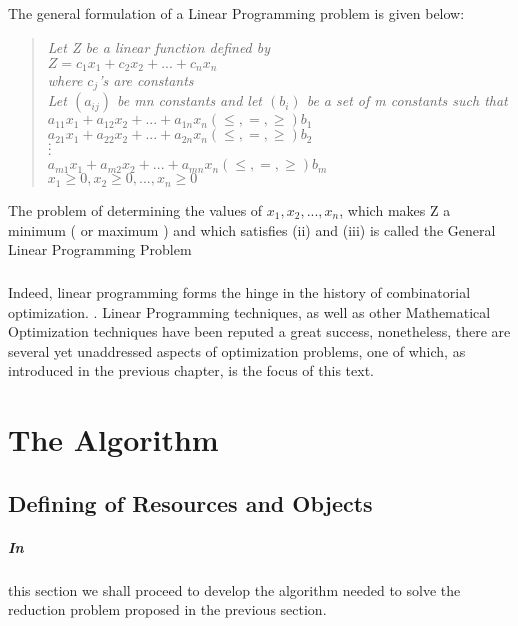 \documentclass[a4paper,openany]{book}
\begin{document}
		\paragraph{}
			The general formulation of a Linear Programming problem is given below:
			\begin{verse}
				\begin{center}
					\textit{
						Let Z be a linear function defined by \\
						$Z = c_1x_1 + c_2x_2+...+c_nx_n$ \\
						where $c_j$'s are constants \\
						Let $(a_{ij})$ be mn constants and let $(b_i)$ be a set of m constants such that \\
						$a_{11}x_1+a_{12}x_2+...+a_{1n}x_n (\leq,=,\geq) b_1$ \\
						$a_{21}x_1+a_{22}x_2+...+a_{2n}x_n (\leq,=,\geq) b_2$ \\
						$\cdot$ \\
						$\cdot$ \\
						$\cdot$ \\
						$a_{m1}x_1+a_{m2}x_2+...+a_{mn}x_n (\leq,=,\geq) b_m$ \\
						$x_1\geq0,x_2\geq0,...,x_n\geq0$ \\
					} \cite{stats}
				\end{center}
			\end{verse}
			The problem of determining the values of $x_1, x_2,...,x_n$, which makes Z a minimum ( or maximum ) and which satisfies (ii) and (iii) is called the General Linear Programming Problem    
		\paragraph{}
		Indeed, linear programming forms the hinge in the history of combinatorial optimization. \cite{schrijver}. Linear Programming techniques, as well as other Mathematical Optimization techniques have been reputed a great success, nonetheless, there are several yet unaddressed aspects of optimization problems, one of which, as introduced in the previous chapter, is the focus of this text.
	\chapter{The Algorithm}
		\section{Defining of Resources and Objects}
			\paragraph{In}
				this section we shall proceed to develop the algorithm needed to solve the reduction problem proposed in the previous section.
\end{document}
